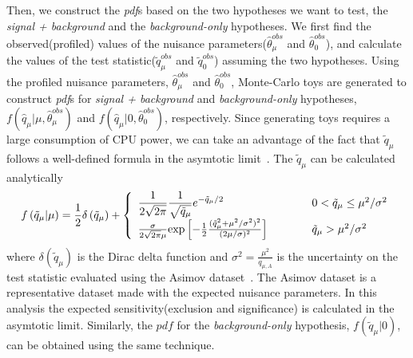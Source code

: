 %
Then, we construct the \textit{pdf}s based on the two hypotheses we 
want to test, the \textit{signal + background} and the \textit{background-only} hypotheses.
We first find the observed(profiled) values of the nuisance 
parameters($\hat{\theta}_\mu^{obs}$ and $\hat{\theta}_0^{obs}$),
and calculate the values of the test statistic($\tilde{q}_\mu^{obs}$ 
and $\tilde{q}_0^{obs}$) assuming the two hypotheses.
Using the profiled nuisance parameters, $\hat{\theta}_\mu^{obs}$ and $\hat{\theta}_0^{obs}$, 
Monte-Carlo toys are generated to construct \textit{pdf}s for \textit{signal + background}
and \textit{background-only} hypotheses, 
$f\left( \hat{q}_\mu | \mu, \hat{\theta}_\mu^{obs} \right)$ and 
$f\left( \hat{q}_\mu | 0, \hat{\theta}_0^{obs} \right)$, respectively.
Since generating toys requires a large consumption of CPU power, 
we can take an advantage of the fact that $\tilde{q}_\mu$ follows 
a well-defined formula in the asymtotic limit~\cite{cowan_asimov}. 
The $\tilde{q}_\mu$ can be calculated analytically
\begin{eqnarray} 
f\left( \tilde{q}_\mu | \mu \right) 
= 
\frac{1}{2} \delta \left( \tilde{q}_\mu \right)  + 
\left\{ \begin{array}{l l}
\displaystyle
\frac{1}{2\sqrt{2\pi}} \frac{1}{\sqrt{\tilde{q}_\mu}}  e^{-\tilde{q}_\mu/2}
   & \quad \quad \quad 0 < \tilde{q}_\mu \le \mu^2/\sigma^2 \\
\frac{\sigma}{2\sqrt{2\pi}\mu} 
   \textrm{exp}\left[-\frac{1}{2} \frac{(\tilde{q}_\mu^2+\mu^2/\sigma^2)^2}{(2\mu/\sigma)^2}   \right]
   & \quad \quad \quad \tilde{q}_\mu > \mu^2/\sigma^2 
\end{array} \right.
\end{eqnarray} 
where $\delta(\tilde{q}_\mu)$ is the Dirac delta function and 
$\displaystyle \sigma^2 = \frac{\mu^2}{q_{\mu,A}}$ 
is the uncertainty on the test statistic evaluated using the Asimov 
dataset~\cite{cowan_asimov}. 
The Asimov dataset is a representative dataset made with the expected 
nuisance parameters. 
In this analysis the expected sensitivity(exclusion and significance) is calculated 
in the asymtotic limit.
Similarly, the $pdf$ for the \textit{background-only} hypothesis,
$f\left( \tilde{q}_\mu | 0 \right)$, can be obtained 
using the same technique. 

